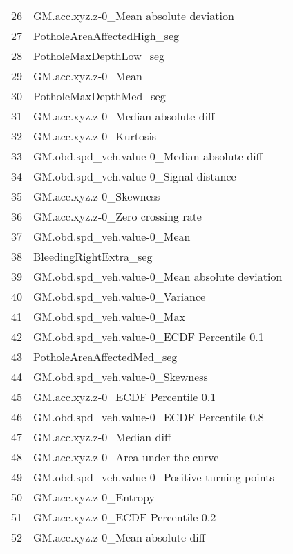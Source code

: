 \begin{tabular}{ll}
26 &            GM.acc.xyz.z-0\_Mean absolute deviation \\
27 &                       PotholeAreaAffectedHigh\_seg \\
28 &                            PotholeMaxDepthLow\_seg \\
29 &                               GM.acc.xyz.z-0\_Mean \\
30 &                            PotholeMaxDepthMed\_seg \\
31 &               GM.acc.xyz.z-0\_Median absolute diff \\
32 &                           GM.acc.xyz.z-0\_Kurtosis \\
33 &       GM.obd.spd\_veh.value-0\_Median absolute diff \\
34 &            GM.obd.spd\_veh.value-0\_Signal distance \\
35 &                           GM.acc.xyz.z-0\_Skewness \\
36 &                 GM.acc.xyz.z-0\_Zero crossing rate \\
37 &                       GM.obd.spd\_veh.value-0\_Mean \\
38 &                            BleedingRightExtra\_seg \\
39 &    GM.obd.spd\_veh.value-0\_Mean absolute deviation \\
40 &                   GM.obd.spd\_veh.value-0\_Variance \\
41 &                        GM.obd.spd\_veh.value-0\_Max \\
42 &        GM.obd.spd\_veh.value-0\_ECDF Percentile 0.1 \\
43 &                        PotholeAreaAffectedMed\_seg \\
44 &                   GM.obd.spd\_veh.value-0\_Skewness \\
45 &                GM.acc.xyz.z-0\_ECDF Percentile 0.1 \\
46 &        GM.obd.spd\_veh.value-0\_ECDF Percentile 0.8 \\
47 &                        GM.acc.xyz.z-0\_Median diff \\
48 &               GM.acc.xyz.z-0\_Area under the curve \\
49 &    GM.obd.spd\_veh.value-0\_Positive turning points \\
50 &                            GM.acc.xyz.z-0\_Entropy \\
51 &                GM.acc.xyz.z-0\_ECDF Percentile 0.2 \\
52 &                 GM.acc.xyz.z-0\_Mean absolute diff \\

\end{tabular}
